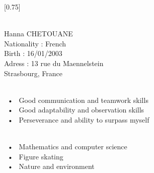 \documentclass[lighthipster]{simplehipstercv}
\begin{document}
\setlength{\columnsep}{1.5cm}
[0.75]
\begin{paracol}{2}

\paracolbackgroundoptions



\footnotesize
{\setasidefontcolour
\flushright
\begin{center}
\end{center}

\bigskip


 \\[0.5em]
Hanna CHETOUANE \\
Nationality : French  \\
Birth : 16/01/2003 \\
Adress : 13 rue du Maennelstein \\ Strasbourg, France


\bigskip
\bigskip
\bigskip


 \\[0.5em]

~•~ Good communication and teamwork skills \\
~•~ Good adaptability and observation skills \\
~•~ Perseverance and ability to surpass myself

\bigskip
\bigskip
\bigskip


\\[0.5em]

~•~ Mathematics and computer science \\
~•~ Figure skating \\
~•~ Nature and environment \\

\bigskip

\vspace{4em}



\phantom{turn the page}

\phantom{turn the page}
}
\switchcolumn


\end{paracol}
\end{document}
